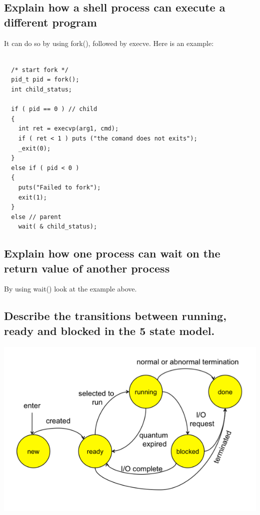 \documentclass[a4paper]{article}
\begin{document}
\subsection{Explain how a shell process can execute a different program} %
\label{sub:Explain how a shell process can execute a different program}
It can do so by using fork(), followed by execve. Here is an example:
\begin{lstlisting}
 
  /* start fork */
  pid_t pid = fork();
  int child_status;

  if ( pid == 0 ) // child
  {
    int ret = execvp(arg1, cmd);
    if ( ret < 1 ) puts ("the comand does not exits");
    _exit(0);
  }
  else if ( pid < 0 )
  {
    puts("Failed to fork");
    exit(1);
  }
  else // parent
    wait( & child_status);
\end{lstlisting}

\subsection{Explain how one process can wait on the return value of another process} %
\label{sub:Explain how one process can wait on the return value of anotehr process}
By using wait() look at the example above.
\subsection{Describe the transitions between running, ready and blocked in the 5 state model.} %
\label{sub:Describe the transitions between running, ready and blocked in the 5 state model.}
\includegraphics[scale=.60]{5-state-trans.png}
\end{document}
